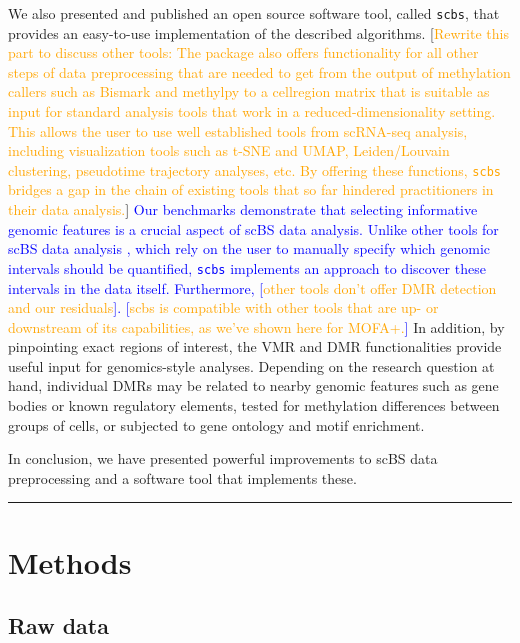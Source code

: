 \documentclass[twocolumn,10pt]{article}
\newcommand{\todo}[1]{[\textcolor{orange}{#1}]}
\newcommand{\new}[1]{\textcolor{blue}{#1}}
\begin{document}
We also presented and published an open source software tool, called \texttt{scbs}, that provides an easy-to-use implementation of the described algorithms.
\todo{Rewrite this part to discuss other tools: The package also offers functionality for all other steps of data preprocessing that are needed to get from the output of methylation callers such as Bismark and methylpy to a cell\texttimes region matrix that is suitable as input for standard analysis tools that work in a reduced-dimensionality setting.
This allows the user to use well established tools from scRNA-seq analysis, including visualization tools such as t-SNE and UMAP, Leiden/Louvain clustering, pseudotime trajectory analyses, etc.
By offering these functions, \texttt{scbs} bridges a gap in the chain of existing tools that so far hindered practitioners in their data analysis.}
\new{
Our benchmarks demonstrate that selecting informative genomic features is a crucial aspect of scBS data analysis.
Unlike other tools for scBS data analysis \citep{}, which rely on the user to manually specify which genomic intervals should be quantified, \texttt{scbs} implements an approach to discover these intervals in the data itself.
Furthermore, \todo{other tools don't offer DMR detection and our residuals}.
\todo{scbs is compatible with other tools that are up- or downstream of its capabilities, as we've shown here for MOFA+.}
}
In addition, by pinpointing exact regions of interest, the VMR and DMR functionalities provide useful input for genomics-style analyses.
Depending on the research question at hand, individual DMRs may be related to nearby genomic features such as gene bodies or known regulatory elements, tested for methylation differences between groups of cells, or subjected to gene ontology and motif enrichment.

In conclusion, we have presented powerful improvements to scBS data preprocessing and a software tool that implements these.


\vspace{1.4ex}
\noindent\hfil\rule{.6\columnwidth}{.2pt}\hfil


\section{Methods}

\subsection{Raw data}
\end{document}
